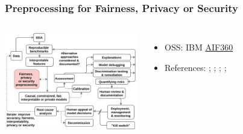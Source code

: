 \documentclass[11pt,
               aspectratio=169,
               hyperref={colorlinks}
               ]{beamer}
\begin{document}
			\begin{frame}
		
				\frametitle{Preprocessing for Fairness, Privacy or Security}		
			
				\begin{columns}
	
					\centering
					\includegraphics[height=120pt]{../img/pre.png}
				
					\vspace{-5pt}
					\begin{itemize}
						\item OSS: IBM \href{https://github.com/IBM/AIF360}{AIF360}
						\item References: ; ; ; ; 
					\end{itemize}
				
				\end{columns}			
			
			\end{frame}
				
\end{document}
